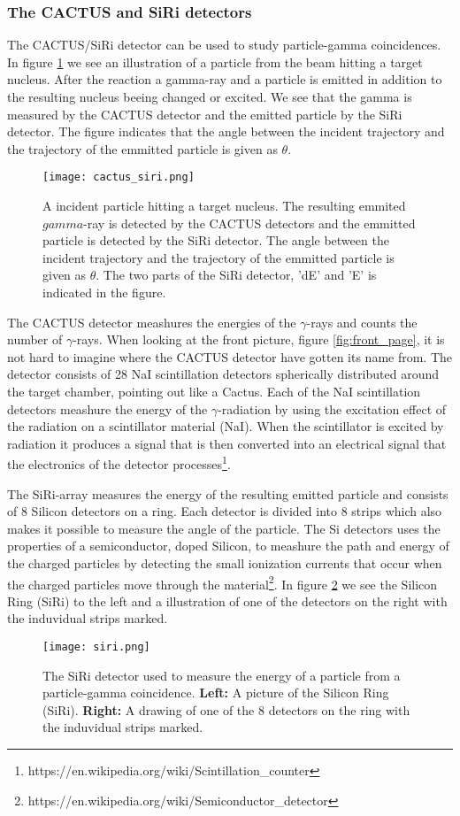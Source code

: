 \documentclass[11pt,a4wide]{article}
\begin{document}
\subsubsection{The CACTUS and SiRi detectors}
The CACTUS/SiRi detector can be used to study particle-gamma coincidences. In figure \ref{fig: cactus_siri} we see an illustration of a particle from the beam hitting a target nucleus. After the reaction a gamma-ray and a particle is emitted in addition to the resulting nucleus beeing changed or excited. We see that the gamma is measured by the CACTUS detector and the emitted particle by the SiRi detector. The figure indicates that the angle between the incident trajectory and the trajectory of the emmitted particle is given as $\theta$.
\begin{figure}[htp]
\centering
\texttt{[image: cactus\_siri.png]}
\caption{A incident particle hitting a target nucleus. The resulting emmited $gamma$-ray is detected by the CACTUS detectors and the emmitted particle is detected by the SiRi detector. The angle between the incident trajectory and the trajectory of the emmitted particle is given as $\theta$. The two parts of the SiRi detector, 'dE' and 'E' is indicated in the figure.}
\label{fig: cactus_siri}
\end{figure}

The CACTUS detector meashures the energies of the $\gamma$-rays and counts the number of $\gamma$-rays. When looking at the front picture, figure \ref{fig:front_page}, it is not hard to imagine where the CACTUS detector have gotten its name from. The detector consists of 28 NaI scintillation detectors spherically distributed around the target chamber, pointing out like a Cactus. Each of the NaI scintillation detectors  meashure the energy of the $\gamma$-radiation by using the excitation effect of the radiation on a scintillator material (NaI). When the scintillator is excited by radiation it produces a signal that is then converted into an electrical signal that the electronics of the detector processes\footnote{https://en.wikipedia.org/wiki/Scintillation\_counter}. 

The SiRi-array measures the energy of the resulting emitted particle and consists of 8 Silicon detectors on a ring. Each detector is divided into 8 strips which also makes it possible to measure the angle of the particle. The Si detectors uses the properties of a semiconductor, doped Silicon, to meashure the path and energy of the charged particles by detecting the small ionization currents that occur when the charged particles move through the material\footnote{https://en.wikipedia.org/wiki/Semiconductor\_detector}. In figure \ref{fig: siri} we see the Silicon Ring (SiRi) to the left and a illustration of one of the detectors on the right with the induvidual strips marked.
\begin{figure}[htp]
\centering
\texttt{[image: siri.png]}
\caption{The SiRi detector used to measure the energy of a particle from a particle-gamma coincidence. \textbf{Left:} A picture of the Silicon Ring (SiRi). \textbf{Right:} A drawing of one of the 8 detectors on the ring with the induvidual strips marked.}
\label{fig: siri}
\end{figure}
\end{document}
